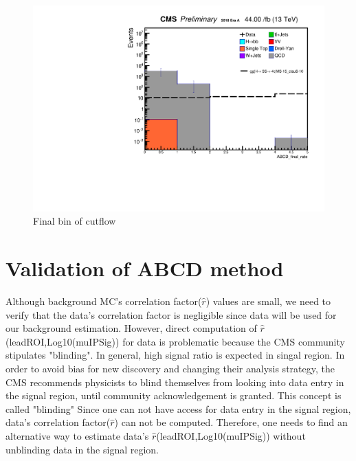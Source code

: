  \begin{figure}[h!]
   \caption{Final bin of cutflow}
   \label{fig:Finalbin}
   \centering
   \includegraphics[width=0.67\linewidth]{figs/log_CutflAnalysisNote_MS-15_ctauS-10_ABCD_final_rate.pdf}
 \end{figure}

\section{Validation of ABCD method}

Although background MC's correlation factor($\hat{r}$) values are small, we need to verify that the data's correlation factor is negligible since data will be used for our background estimation.
However, direct computation of $\hat{r}$(leadROI,Log10(muIPSig)) for data is problematic because the CMS community stipulates "blinding".
In general, high signal ratio is expected in singal region.
In order to avoid bias for new discovery and changing their analysis strategy, the CMS recommends physicists to blind themselves from looking into data entry in the signal region, until community acknowledgement is granted.
This concept is called "blinding"
Since one can not have access for data entry in the signal region, data's correlation factor($\hat{r}$) can not be computed. 
Therefore, one needs to find an alternative way to estimate data's $\hat{r}$(leadROI,Log10(muIPSig)) without unblinding data in the signal region.

